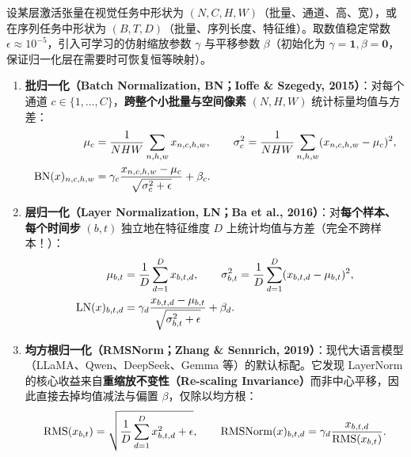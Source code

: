 \begin{defBox}
\begin{definition}
设某层激活张量在视觉任务中形状为 $(N, C, H, W)$（批量、通道、高、宽），或在序列任务中形状为 $(B, T, D)$（批量、序列长度、特征维）。取数值稳定常数 $\epsilon \approx 10^{-5}$，引入可学习的仿射缩放参数 $\gamma$ 与平移参数 $\beta$（初始化为 $\gamma = \mathbf{1}, \beta = \mathbf{0}$，保证归一化层在需要时可恢复恒等映射）。
\begin{enumerate}
  \item \textbf{批归一化（Batch Normalization, BN；Ioffe \& Szegedy, 2015）}：对每个通道 $c \in \{1,\dots,C\}$，\textbf{跨整个小批量与空间像素} $(N, H, W)$ 统计标量均值与方差：
  \begin{equation}
  \begin{aligned}
    \mu_c &= \frac{1}{NHW}\sum_{n,h,w} x_{n,c,h,w}, \qquad
    \sigma_c^2 = \frac{1}{NHW}\sum_{n,h,w} (x_{n,c,h,w} - \mu_c)^2, \\
    \operatorname{BN}(x)_{n,c,h,w} &= \gamma_c \frac{x_{n,c,h,w} - \mu_c}{\sqrt{\sigma_c^2 + \epsilon}} + \beta_c.
  \end{aligned}
  \label{eq:bn}
  \end{equation}
  \item \textbf{层归一化（Layer Normalization, LN；Ba et al., 2016）}：对\textbf{每个样本、每个时间步} $(b, t)$ 独立地在特征维度 $D$ 上统计均值与方差（完全不跨样本！）：
  \begin{equation}
  \begin{aligned}
    \mu_{b,t} &= \frac{1}{D}\sum_{d=1}^{D} x_{b,t,d}, \qquad
    \sigma_{b,t}^2 = \frac{1}{D}\sum_{d=1}^{D} (x_{b,t,d} - \mu_{b,t})^2, \\
    \operatorname{LN}(x)_{b,t,d} &= \gamma_d \frac{x_{b,t,d} - \mu_{b,t}}{\sqrt{\sigma_{b,t}^2 + \epsilon}} + \beta_d.
  \end{aligned}
  \label{eq:ln}
  \end{equation}
  \item \textbf{均方根归一化（RMSNorm；Zhang \& Sennrich, 2019）}：现代大语言模型（LLaMA、Qwen、DeepSeek、Gemma 等）的默认标配。它发现 LayerNorm 的核心收益来自\textbf{重缩放不变性（Re-scaling Invariance）}而非中心平移，因此直接去掉均值减法与偏置 $\beta$，仅除以均方根：
  \begin{equation}
    \operatorname{RMS}(x_{b,t}) = \sqrt{\frac{1}{D}\sum_{d=1}^{D} x_{b,t,d}^2 + \epsilon}, \qquad
    \operatorname{RMSNorm}(x)_{b,t,d} = \gamma_d \frac{x_{b,t,d}}{\operatorname{RMS}(x_{b,t})}.
    \label{eq:rmsnorm}
  \end{equation}
\end{enumerate}
\end{definition}
\end{defBox}

